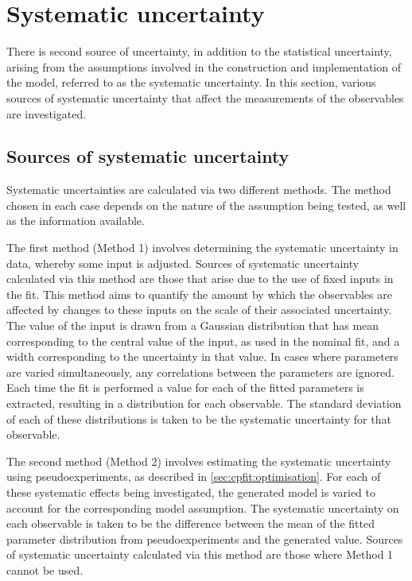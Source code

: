 
\section{Systematic uncertainty}
\label{sec:systematics}

There is second source of uncertainty, in addition to the statistical uncertainty, arising from the assumptions involved in the construction and implementation of the model, referred to as the systematic uncertainty. In this section, various sources of systematic uncertainty that affect the measurements of the \CP observables are investigated. 

\subsection{Sources of systematic uncertainty}

Systematic uncertainties are calculated via two different methods. The method chosen in each case depends on the nature of the assumption being tested, as well as the information available. 

The first method (Method 1) involves determining the systematic uncertainty in data, whereby some input is adjusted. Sources of systematic uncertainty calculated via this method are those that arise due to the use of fixed inputs in the \CP fit. This method aims to quantify the amount by which the \CP observables are affected by changes to these inputs on the scale of their associated uncertainty. The value of the input is drawn from a Gaussian distribution that has mean corresponding to the central value of the input, as used in the nominal fit, and a width corresponding to the uncertainty in that value. In cases where parameters are varied simultaneously, any correlations between the parameters are ignored. Each time the \CP fit is performed a value for each of the fitted parameters is extracted, resulting in a distribution for each \CP observable. The standard deviation of each of these distributions is taken to be the systematic uncertainty for that \CP observable. 

The second method (Method 2) involves estimating the systematic uncertainty using pseudoexperiments, as described in \sect\ref{sec:cpfit:optimisation}. For each of these systematic effects being investigated, the generated model is varied to account for the corresponding model assumption. The systematic uncertainty on each observable is taken to be the difference between the mean of the fitted parameter distribution from pseudoexperiments and the generated value. Sources of systematic uncertainty calculated via this method are those where Method 1 cannot be used.

